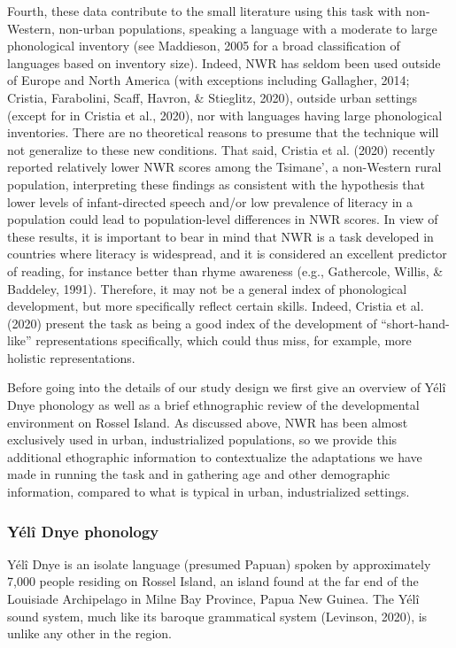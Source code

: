 \documentclass[english,,man,floatsintext]{apa6}
\begin{document}
Fourth, these data contribute to the small literature using this task with non-Western, non-urban populations, speaking a language with a moderate to large phonological inventory (see Maddieson, 2005 for a broad classification of languages based on inventory size). Indeed, NWR has seldom been used outside of Europe and North America (with exceptions including Gallagher, 2014; Cristia, Farabolini, Scaff, Havron, \& Stieglitz, 2020), outside urban settings (except for in Cristia et al., 2020), nor with languages having large phonological inventories. There are no theoretical reasons to presume that the technique will not generalize to these new conditions. That said, Cristia et al. (2020) recently reported relatively lower NWR scores among the Tsimane', a non-Western rural population, interpreting these findings as consistent with the hypothesis that lower levels of infant-directed speech and/or low prevalence of literacy in a population could lead to population-level differences in NWR scores. In view of these results, it is important to bear in mind that NWR is a task developed in countries where literacy is widespread, and it is considered an excellent predictor of reading, for instance better than rhyme awareness (e.g., Gathercole, Willis, \& Baddeley, 1991). Therefore, it may not be a general index of phonological development, but more specifically reflect certain skills. Indeed, Cristia et al. (2020) present the task as being a good index of the development of \enquote{short-hand-like} representations specifically, which could thus miss, for example, more holistic representations.

Before going into the details of our study design we first give an overview of Yélî Dnye phonology as well as a brief ethnographic review of the developmental environment on Rossel Island. As discussed above, NWR has been almost exclusively used in urban, industrialized populations, so we provide this additional ethographic information to contextualize the adaptations we have made in running the task and in gathering age and other demographic information, compared to what is typical in urban, industrialized settings.

\hypertarget{yuxe9luxee-dnye-phonology}{%
\subsubsection{Yélî Dnye phonology}\label{yuxe9luxee-dnye-phonology}}

Yélî Dnye is an isolate language (presumed Papuan) spoken by approximately 7,000 people residing on Rossel Island, an island found at the far end of the Louisiade Archipelago in Milne Bay Province, Papua New Guinea. The Yélî sound system, much like its baroque grammatical system (Levinson, 2020), is unlike any other in the region.
\end{document}
